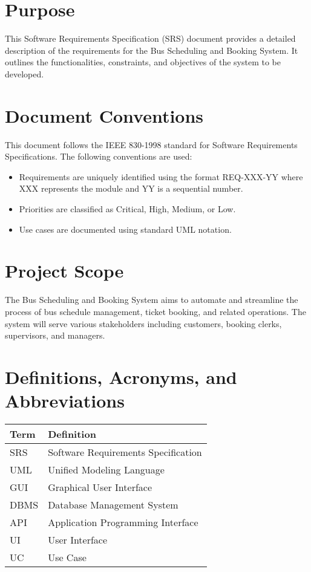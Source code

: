 \documentclass[12pt,a4paper]{report}
\begin{document}
\section{Purpose}
This Software Requirements Specification (SRS) document provides a detailed description of the requirements for the Bus Scheduling and Booking System. It outlines the functionalities, constraints, and objectives of the system to be developed.

\section{Document Conventions}
This document follows the IEEE 830-1998 standard for Software Requirements Specifications. The following conventions are used:
\begin{itemize}
    \item Requirements are uniquely identified using the format REQ-XXX-YY where XXX represents the module and YY is a sequential number.
    \item Priorities are classified as Critical, High, Medium, or Low.
    \item Use cases are documented using standard UML notation.
\end{itemize}

\section{Project Scope}
The Bus Scheduling and Booking System aims to automate and streamline the process of bus schedule management, ticket booking, and related operations. The system will serve various stakeholders including customers, booking clerks, supervisors, and managers.

\section{Definitions, Acronyms, and Abbreviations}
\begin{tabularx}{\textwidth}{|l|X|}
    \hline
    \textbf{Term} & \textbf{Definition} \\
    \hline
    SRS & Software Requirements Specification \\
    \hline
    UML & Unified Modeling Language \\
    \hline
    GUI & Graphical User Interface \\
    \hline
    DBMS & Database Management System \\
    \hline
    API & Application Programming Interface \\
    \hline
    UI & User Interface \\
    \hline
    UC & Use Case \\
    \hline
\end{tabularx}
\end{document}
